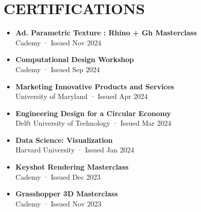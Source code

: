 \documentclass[11pt,a4paper]{article}
\begin{document}
\section*{CERTIFICATIONS}
\begin{itemize}[leftmargin=*,label={},itemsep=2pt]
    \item \textbf{Ad. Parametric Texture : Rhino + Gh Masterclass}\\
    Cademy · Issued Nov 2024
    
    \item \textbf{Computational Design Workshop}\\
    Cademy · Issued Sep 2024
    
    \item \textbf{Marketing Innovative Products and Services}\\
    University of Maryland · Issued Apr 2024
    
    \item \textbf{Engineering Design for a Circular Economy}\\
    Delft University of Technology · Issued Mar 2024
    
    \item \textbf{Data Science: Visualization}\\
    Harvard University · Issued Jan 2024
    
    \item \textbf{Keyshot Rendering Masterclass}\\
    Cademy · Issued Dec 2023
    
    \item \textbf{Grasshopper 3D Masterclass}\\
    Cademy · Issued Nov 2023
\end{itemize}
\end{document}
